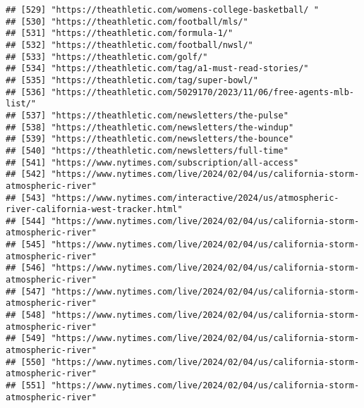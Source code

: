 \documentclass[
]{article}
\begin{document}
\begin{verbatim}
## [529] "https://theathletic.com/womens-college-basketball/ "                                                       
## [530] "https://theathletic.com/football/mls/"                                                                     
## [531] "https://theathletic.com/formula-1/"                                                                        
## [532] "https://theathletic.com/football/nwsl/"                                                                    
## [533] "https://theathletic.com/golf/"                                                                             
## [534] "https://theathletic.com/tag/a1-must-read-stories/"                                                         
## [535] "https://theathletic.com/tag/super-bowl/"                                                                   
## [536] "https://theathletic.com/5029170/2023/11/06/free-agents-mlb-list/"                                          
## [537] "https://theathletic.com/newsletters/the-pulse"                                                             
## [538] "https://theathletic.com/newsletters/the-windup"                                                            
## [539] "https://theathletic.com/newsletters/the-bounce"                                                            
## [540] "https://theathletic.com/newsletters/full-time"                                                             
## [541] "https://www.nytimes.com/subscription/all-access"                                                           
## [542] "https://www.nytimes.com/live/2024/02/04/us/california-storm-atmospheric-river"                             
## [543] "https://www.nytimes.com/interactive/2024/us/atmospheric-river-california-west-tracker.html"                
## [544] "https://www.nytimes.com/live/2024/02/04/us/california-storm-atmospheric-river"                             
## [545] "https://www.nytimes.com/live/2024/02/04/us/california-storm-atmospheric-river"                             
## [546] "https://www.nytimes.com/live/2024/02/04/us/california-storm-atmospheric-river"                             
## [547] "https://www.nytimes.com/live/2024/02/04/us/california-storm-atmospheric-river"                             
## [548] "https://www.nytimes.com/live/2024/02/04/us/california-storm-atmospheric-river"                             
## [549] "https://www.nytimes.com/live/2024/02/04/us/california-storm-atmospheric-river"                             
## [550] "https://www.nytimes.com/live/2024/02/04/us/california-storm-atmospheric-river"                             
## [551] "https://www.nytimes.com/live/2024/02/04/us/california-storm-atmospheric-river"                             

\end{verbatim}
\end{document}
